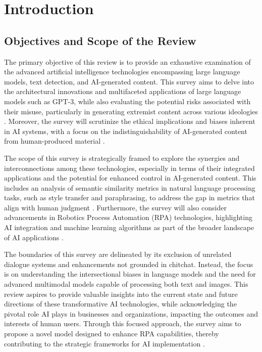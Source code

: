 \section{Introduction} \label{sec:Introduction}


\subsection{Objectives and Scope of the Review} \label{subsec:Objectives and Scope of the Review}



The primary objective of this review is to provide an exhaustive examination of the advanced artificial intelligence technologies encompassing large language models, text detection, and AI-generated content. This survey aims to delve into the architectural innovations and multifaceted applications of large language models such as GPT-3, while also evaluating the potential risks associated with their misuse, particularly in generating extremist content across various ideologies \cite{mcguffie2020radicalizationrisksgpt3advanced}. Moreover, the survey will scrutinize the ethical implications and biases inherent in AI systems, with a focus on the indistinguishability of AI-generated content from human-produced material \cite{yamshchikov2020styletransferparaphraselookingsensible}. 



The scope of this survey is strategically framed to explore the synergies and interconnections among these technologies, especially in terms of their integrated applications and the potential for enhanced control in AI-generated content. This includes an analysis of semantic similarity metrics in natural language processing tasks, such as style transfer and paraphrasing, to address the gap in metrics that align with human judgment \cite{yamshchikov2020styletransferparaphraselookingsensible}. Furthermore, the survey will also consider advancements in Robotics Process Automation (RPA) technologies, highlighting AI integration and machine learning algorithms as part of the broader landscape of AI applications \cite{pandy2024advancementsroboticsprocessautomation}.



The boundaries of this survey are delineated by its exclusion of unrelated dialogue systems and enhancements not grounded in chitchat. Instead, the focus is on understanding the intersectional biases in language models and the need for advanced multimodal models capable of processing both text and images. This review aspires to provide valuable insights into the current state and future directions of these transformative AI technologies, while acknowledging the pivotal role AI plays in businesses and organizations, impacting the outcomes and interests of human users. Through this focused approach, the survey aims to propose a novel model designed to enhance RPA capabilities, thereby contributing to the strategic frameworks for AI implementation \cite{pandy2024advancementsroboticsprocessautomation}.



